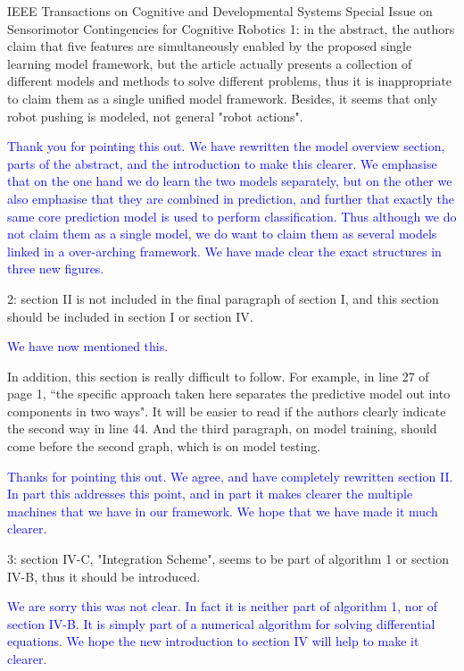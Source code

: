 \documentclass[a4paper,12pt]{letter}
\newcommand{\comment}[1]{\textcolor{blue}{#1}}
\newcommand{\marker}{\hspace*{-1.6em}\textcolor{red}{$\Longrightarrow$}}
\begin{document}
\begin{letter}{IEEE Transactions on Cognitive and Developmental Systems\newline
Special Issue on Sensorimotor Contingencies for Cognitive Robotics}
1: in the abstract, the authors claim that five features are simultaneously enabled by the proposed single learning model framework, but the article actually presents a collection of different models and methods to solve different problems, thus it is inappropriate to claim them as a single unified model framework. Besides, it seems that only robot pushing is modeled, not general "robot actions". 

\comment{Thank you for pointing this out. We have rewritten the model overview section, parts of the abstract, and the introduction to make this clearer. We emphasise that on the one hand we do learn the two models separately, but on the other we also emphasise that they are combined in prediction, and further that exactly the same core prediction model is used to perform classification. Thus although we do not claim them as a single model, we do want to claim them as several models linked in a over-arching framework. We have made clear the exact structures in three new figures.}

2: section II is not included in the final paragraph of section I, and this section should be included in section I or section IV.

\comment{We have now mentioned this.}

In addition, this section is really difficult to follow. For example, in line 27 of page 1, “the specific approach taken here separates the predictive model out into components in two ways". It will be easier to read if the authors clearly indicate the second way in line 44. And the third paragraph, on model training, should come before the second graph, which is on model testing. 

\comment{Thanks for pointing this out. We agree, and have completely rewritten section II. In part this addresses this point, and in part it makes clearer the multiple machines that we have in our framework. We hope that we have made it much clearer.}

3: section IV-C, "Integration Scheme", seems to be part of algorithm 1 or section IV-B, thus it should be introduced.

\comment{We are sorry this was not clear. In fact it is neither part of algorithm 1, nor of section IV-B.  It is simply part of a numerical algorithm for solving differential equations.  We hope the new introduction to section IV will help to make it clearer.}


\end{letter}
\end{document}
